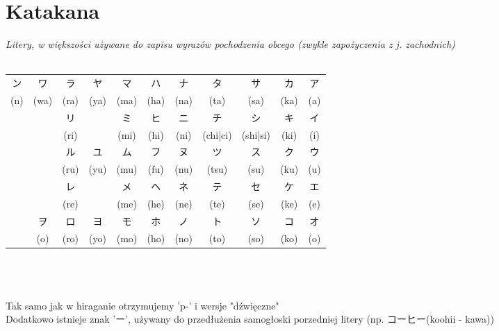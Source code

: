\documentclass[10pt, a4paper]{article}
\begin{document}
	
	\newpage
	\section{Katakana}
	{\large \textit{Litery, w większości używane do zapisu wyrazów pochodzenia obcego (zwykle zapożyczenia z j. zachodnich)}}\\\\
	\def\arraystretch{1.25}%
	\begin{tabular}{|c|c|c|c|c|c|c|c|c|c|c|}
		\hline
		ン & ワ & ラ & ヤ & マ & ハ & ナ & タ & サ & カ & ア\\
		(n) & (wa) & (ra) & (ya) & (ma) & (ha) & (na) & (ta) & (sa) & (ka) & (a) \\
		\hline
		& & リ & & ミ & ヒ & ニ & チ & シ & キ & イ \\
		& & (ri) & & (mi) & (hi) & (ni) & (chi|ci) & (shi|si) & (ki) & (i) \\
		\hline
		& & ル & ユ & ム & フ & ヌ & ツ & ス & ク & ウ \\
		& & (ru) & (yu) & (mu) & (fu) & (nu) & (tsu) & (su) & (ku) & (u) \\
		\hline
		& & レ & & メ & ヘ & ネ & テ & セ & ケ & エ \\
		& & (re) & & (me) & (he) & (ne) & (te) & (se) & (ke) & (e) \\
		\hline
		& ヲ\footnotemark & ロ & ヨ & モ & ホ & ノ & ト & ソ & コ & オ \\
		& (o) & (ro) & (yo) & (mo) & (ho) & (no) & (to) & (so) & (ko) & (o) \\
		\hline
	\end{tabular} \\ \\ \\
	\def\arraystretch{0.75}%
	Tak samo jak w hiraganie otrzymujemy 'p-' i wersje "dźwięczne" \\
	Dodatkowo istnieje znak 'ー', używany do przedłużenia samogłoski porzedniej litery (np. コーヒー(koohii - kawa)) \\
\end{document}

